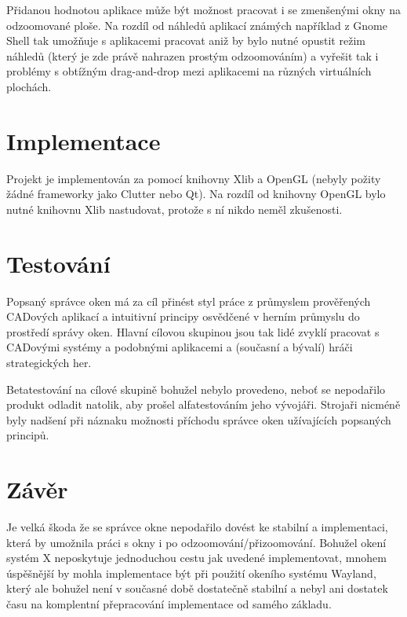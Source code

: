 \documentclass[12pt,a4paper,titlepage,final]{article}
\begin{document}
Přidanou hodnotou aplikace může být možnost pracovat i se zmenšenými okny na odzoomované ploše.
Na rozdíl od náhledů aplikací známých například z Gnome Shell tak umožňuje s aplikacemi pracovat aniž by bylo nutné opustit režim náhledů (který je zde právě nahrazen prostým odzoomováním) a vyřešit tak i problémy s obtížným drag-and-drop mezi aplikacemi na různých virtuálních plochách.

\section{Implementace}

Projekt je implementován za pomocí knihovny Xlib a OpenGL (nebyly požity žádné frameworky jako Clutter nebo Qt).
Na rozdíl od knihovny OpenGL bylo nutné knihovnu Xlib nastudovat, protože s ní nikdo neměl zkušenosti.


\section{Testování}

Popsaný správce oken má za cíl přinést styl práce z průmyslem prověřených CADových aplikací a intuitivní principy osvědčené v herním průmyslu do prostředí správy oken.
Hlavní cílovou skupinou jsou tak lidé zvyklí pracovat s CADovými systémy a podobnými aplikacemi a (současní a bývalí) hráči strategických her.

Betatestování na cílové skupině bohužel nebylo provedeno, neboť se nepodařilo produkt odladit natolik,
aby prošel alfatestováním jeho vývojáři. Strojaři nicméně byly nadšení při náznaku možnosti příchodu správce
oken užívajících popsaných principů.

\section{Závěr} \label{zaver}

Je velká škoda že se správce okne nepodařilo dovést ke stabilní a implementaci, která by umožnila práci s okny
i po odzoomování/přizoomování. Bohužel okení systém X neposkytuje jednoduchou cestu jak uvedené implementovat,
mnohem úspěšnější by mohla implementace být při použití okeního systému Wayland, který ale bohužel není v současné
době dostatečně stabilní a nebyl ani dostatek času na komplentní přepracování implementace od samého základu.
\end{document}
